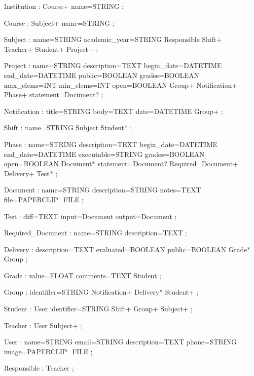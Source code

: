 \begin{spverbatim}
Institution : Course+ name=STRING
            ;

Course : Subject+ name=STRING
       ;

Subject : name=STRING academic_year=STRING Responsible Shift+ Teacher+ Student+ Project+
        ;

Project : name=STRING description=TEXT begin_date=DATETIME end_date=DATETIME public=BOOLEAN grades=BOOLEAN max_elems=INT min_elems=INT open=BOOLEAN Group+ Notification+ Phase+ statement=Document?
        ;

Notification : title=STRING body=TEXT date=DATETIME Group+
             ;

Shift : name=STRING Subject Student*
      ;

Phase : name=STRING description=TEXT begin_date=DATETIME end_date=DATETIME executable=STRING grades=BOOLEAN open=BOOLEAN Document* statement=Document? Required_Document+ Delivery+ Test*
      ;

Document : name=STRING description=STRING notes=TEXT file=PAPERCLIP_FILE
     ;

Test : diff=TEXT input=Document output=Document
     ;

Required_Document : name=STRING description=TEXT
              ;

Delivery : description=TEXT evaluated=BOOLEAN public=BOOLEAN Grade* Group
         ;

Grade : value=FLOAT comments=TEXT Student
      ;

Group : identifier=STRING Notification+ Delivery* Student+
      ;

Student : User identifier=STRING Shift+ Group+ Subject+
        ;

Teacher : User Subject+
        ;

User : name=STRING email=STRING description=TEXT phone=STRING image=PAPERCLIP_FILE
     ;

Responsible : Teacher
            ;
\end{spverbatim}


\newpage
